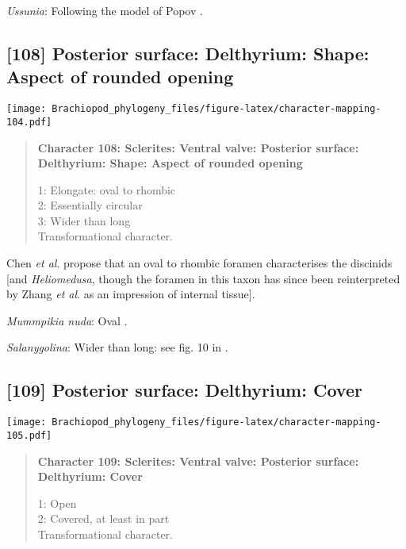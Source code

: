\documentclass[openany]{book}
\theoremstyle{definition}
\theoremstyle{definition}
\theoremstyle{definition}
\theoremstyle{remark}
\begin{document}
\hypertarget{Ussunia-coding-107}{}
\emph{Ussunia}: Following the model of Popov
\citeyearpar{Popov1992TheCambrian}.

\subsection*{{[}108{]} Posterior surface: Delthyrium: Shape: Aspect of
rounded
opening}\label{posterior-surface-delthyrium-shape-aspect-of-rounded-opening}

\texttt{[image: Brachiopod\_phylogeny\_files/figure-latex/character-mapping-104.pdf]}

\begin{quote}
\textbf{Character 108: Sclerites: Ventral valve: Posterior surface:
Delthyrium: Shape: Aspect of rounded opening}

1: Elongate: oval to rhombic\\
2: Essentially circular\\
3: Wider than long\\
Transformational character.
\end{quote}

Chen \emph{et al}. \citeyearpar{Chen2007Reinterpretationof} propose that
an oval to rhombic foramen characterises the discinids {[}and
\emph{Heliomedusa}, though the foramen in this taxon has since been
reinterpreted by Zhang \emph{et al}.
\citeyearpar{Zhang2009Architectureand} as an impression of internal
tissue{]}.

\hypertarget{Mummpikia_nuda-coding-108}{}
\emph{Mummpikia nuda}: Oval
\citep{Williams2000LinguliformeaCraniiformea}.

\hypertarget{Salanygolina-coding-108}{}
\emph{Salanygolina}: Wider than long: see fig. 10 in
\citet{Balthasar2004Shellstructure}.

\subsection*{{[}109{]} Posterior surface: Delthyrium:
Cover}\label{posterior-surface-delthyrium-cover}

\texttt{[image: Brachiopod\_phylogeny\_files/figure-latex/character-mapping-105.pdf]}

\begin{quote}
\textbf{Character 109: Sclerites: Ventral valve: Posterior surface:
Delthyrium: Cover}

1: Open\\
2: Covered, at least in part\\
Transformational character.
\end{quote}
\end{document}
